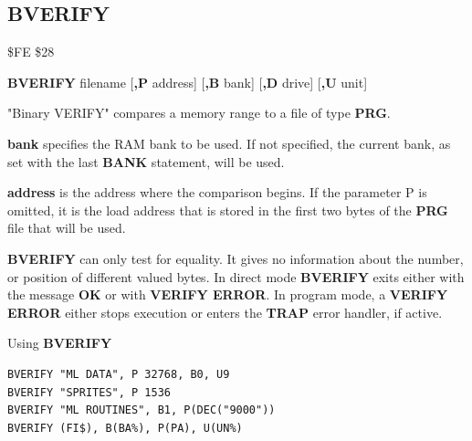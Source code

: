 
\newpage
\subsection{BVERIFY}
\begin{description}[leftmargin=2cm,style=nextline]
\item [Token:] \$FE \$28
\item [Format:] {\bf BVERIFY} filename [{\bf,P} address]
                [{\bf,B} bank] [{\bf,D} drive] [{\bf,U} unit]
\item [Usage:]
   "Binary VERIFY" compares a memory range to
   a file of type {\bf PRG}.

   \filenamedefinition

   {\bf bank} specifies the RAM bank to be used.
   If not specified, the current bank, as set with the last
   {\bf BANK} statement, will be used.

   {\bf address} is the address where the comparison begins.
   If the parameter P is omitted, it is the load address
   that is stored in the first two bytes of the {\bf PRG} file that will be used.

   \drivedefinition

   \unitdefinition

\item [Remarks:]
   {\bf BVERIFY} can only test for equality. It gives no information
   about the number, or position of different valued bytes.
   In direct mode {\bf BVERIFY} exits either with the message {\bf OK}
   or with {\bf VERIFY ERROR}. In program mode, a {\bf VERIFY ERROR}
   either stops execution or enters the {\bf TRAP} error handler,
   if active.

\item [Examples:] Using {\bf BVERIFY}
\begin{tcolorbox}[colback=black,coltext=white]
\verbatimfont{\codefont}
\begin{verbatim}
BVERIFY "ML DATA", P 32768, B0, U9
BVERIFY "SPRITES", P 1536
BVERIFY "ML ROUTINES", B1, P(DEC("9000"))
BVERIFY (FI$), B(BA%), P(PA), U(UN%)
\end{verbatim}
\end{tcolorbox}
\end{description}


\newpage
